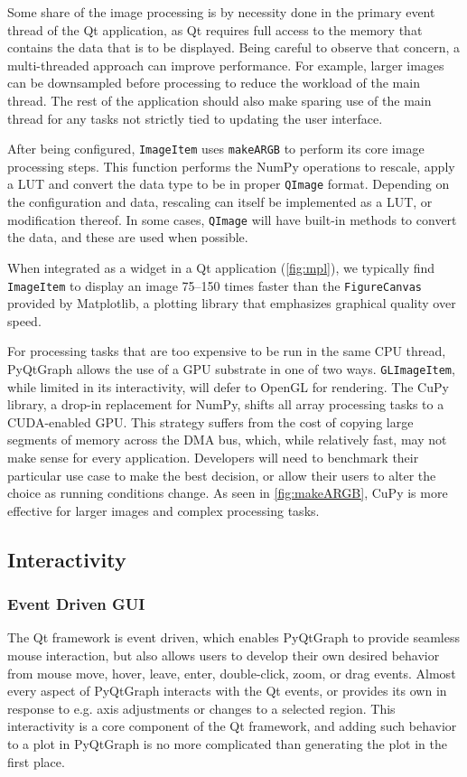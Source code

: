 \documentclass[journal]{vgtc}                %
\begin{document}
\color{brown} 
Some share of the image processing is by necessity done in the primary event thread of the Qt application, as Qt requires full access to the memory that contains the data that is to be displayed. Being careful to observe that concern, a multi-threaded approach can improve performance. For example, larger images can be downsampled before processing to reduce the workload of the main thread. The rest of the application should also make sparing use of the main thread for any tasks not strictly tied to updating the user interface.

After being configured, \texttt{ImageItem} uses \texttt{makeARGB} to perform its core image processing steps. This function performs the NumPy operations to rescale, apply a LUT and convert the data type to be in proper \texttt{QImage} format. Depending on the configuration and data, rescaling can itself be implemented as a LUT, or modification thereof. In some cases, \texttt{QImage} will have built-in methods to convert the data, and these are used when possible. 

When integrated as a widget in a Qt application (\autoref{fig:mpl}), we typically find \texttt{ImageItem} to display an image 75--150 times faster than the \texttt{FigureCanvas} provided by Matplotlib, a plotting library that emphasizes graphical quality over speed.


For processing tasks that are too expensive to be run in the same CPU thread, PyQtGraph allows the use of a GPU substrate in one of two ways. \texttt{GLImageItem}, while limited in its interactivity, will defer to OpenGL for rendering. The CuPy library, a drop-in replacement for NumPy, shifts all array processing tasks to a CUDA-enabled GPU. This strategy suffers from the cost of copying large segments of memory across the DMA bus, which, while relatively fast, may not make sense for every application. Developers will need to benchmark their particular use case to make the best decision, or allow their users to alter the choice as running conditions change. As seen in \autoref{fig:makeARGB}, CuPy is more effective for larger images and complex processing tasks.
\color{black}


\subsection{Interactivity}
\subsubsection{Event Driven GUI}
The Qt framework is event driven, which enables PyQtGraph to provide seamless mouse interaction, but also allows users to develop their own desired behavior from mouse move, hover, leave, enter, double-click, zoom, or drag events. Almost every aspect of PyQtGraph interacts with the Qt events, or provides its own in response to e.g. axis adjustments or changes to a selected region. This interactivity is a core component of the Qt framework, and adding such behavior to a plot in PyQtGraph is no more complicated than generating the plot in the first place.
\end{document}
